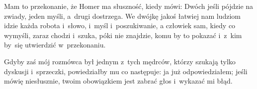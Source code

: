 \documentclass[a4paper,11pt]{article}
\begin{document}

\vspace{\spaceThree}



\noindent
Mam to przekonanie, że Homer ma słuszność, kiedy mówi: Dwóch
jeśli pójdzie na zwiady, jeden myśli, a~drugi dostrzega. We dwójkę
jakoś łatwiej nam ludziom idzie każda robota i~słowo, i~myśl
i~poszukiwanie, a człowiek sam, kiedy co wymyśli, zaraz chodzi
i~szuka, póki nie znajdzie, komu by to pokazać i~z~kim by~się
utwierdzić w~przekonaniu.


\vspace{\spaceThree}



\noindent
Gdyby zaś mój rozmówca był jednym z~tych mędrców, którzy szukają
tylko dyskusji i~sprzeczki, powiedziałby mu co następuje: ja już
odpowiedziałem; jeśli mówię niesłusznie, twoim obowiązkiem jest zabrać
głos i~wykazać mi błąd.


\vspace{\spaceThree}







\end{document}
